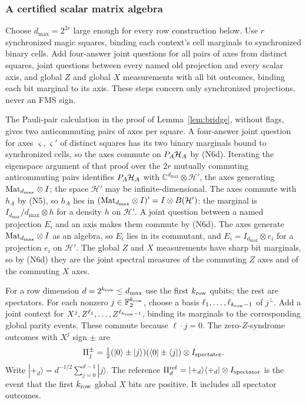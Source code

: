 \subsubsection{A certified scalar matrix algebra}
Choose $d_{\max}=2^{2r}$ large enough for every row construction below. Use $r$ synchronized magic squares, binding each context's cell marginals to synchronized binary cells. Add four-answer joint questions for all pairs of axes from distinct squares, joint questions between every named old projection and every scalar axis, and global $Z$ and global $X$ measurements with all bit outcomes, binding each bit marginal to its axis. These steps concern only synchronized projections, never an FMS sign.

The Pauli-pair calculation in the proof of Lemma~\ref{lem:bridge}, without flags, gives two anticommuting pairs of axes per square. A four-answer joint question for axes $\varsigma,\varsigma'$ of distinct squares has its two binary marginals bound to synchronized cells, so the axes commute on $P_A\mathcal H_A$ by (N6d). Iterating the eigenspace argument of that proof over the $2r$ mutually commuting anticommuting pairs identifies $P_A\mathcal H_A$ with $\mathbb C^{d_{\max}}\otimes\mathcal H'$, the axes generating $\mathrm{Mat}_{d_{\max}}\otimes I$; the space $\mathcal H'$ may be infinite-dimensional. The axes commute with $h_A$ by (N5), so $h_A$ lies in $(\mathrm{Mat}_{d_{\max}}\otimes I)'=I\otimes B(\mathcal H')$: the marginal is $I_{d_{\max}}/d_{\max}\otimes h$ for a density $h$ on $\mathcal H'$. A joint question between a named projection $E_i$ and an axis makes them commute by (N6d). The axes generate $\mathrm{Mat}_{d_{\max}}\otimes I$ as an algebra, so $E_i$ lies in its commutant, and $E_i=I_{d_{\max}}\otimes e_i$ for a projection $e_i$ on $\mathcal H'$. The global $Z$ and $X$ measurements have sharp bit marginals, so by (N6d) they are the joint spectral measures of the commuting $Z$ axes and of the commuting $X$ axes.

For a row dimension $d=2^{k_{\rm row}}\leq d_{\max}$ use the first ${k_{\rm row}}$ qubits; the rest are spectators. For each nonzero $j\in\mathbb F_2^{k_{\rm row}}$, choose a basis $\ell_1,\ldots,\ell_{{k_{\rm row}}-1}$ of $j^\perp$. Add a joint context for $X^j,Z^{\ell_1},\ldots,Z^{\ell_{{k_{\rm row}}-1}}$, binding its marginals to the corresponding global parity events. These commute because $\ell\cdot j=0$. The zero-$Z$-syndrome outcomes with $X^j$ sign $\pm$ are
\[
 \Pi_j^\pm=\tfrac12(|0\rangle\pm|j\rangle)(\langle0|\pm\langle j|)
                       \otimes I_{\rm spectator}.
\]
Write $|+_d\rangle=d^{-1/2}\sum_{j=0}^{d-1}|j\rangle$. The reference $\Pi^{\rm ref}_d=|+_d\rangle\langle+_d|\otimes I_{\rm spectator}$ is the event that the first ${k_{\rm row}}$ global $X$ bits are positive. It includes all spectator outcomes.

